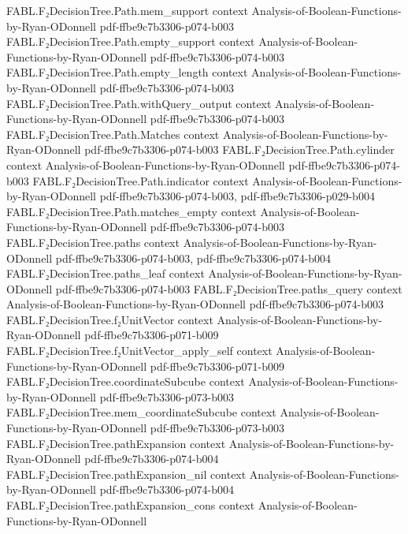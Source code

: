 \begin{theorem}
  {FABL.F₂DecisionTree.Path.mem_support}
  {context}
  {Analysis-of-Boolean-Functions-by-Ryan-ODonnell}
  {pdf-ffbe9c7b3306-p074-b003}
\proofstep
  {FABL.F₂DecisionTree.Path.empty_support}
  {context}
  {Analysis-of-Boolean-Functions-by-Ryan-ODonnell}
  {pdf-ffbe9c7b3306-p074-b003}
\proofstep
  {FABL.F₂DecisionTree.Path.empty_length}
  {context}
  {Analysis-of-Boolean-Functions-by-Ryan-ODonnell}
  {pdf-ffbe9c7b3306-p074-b003}
\proofstep
  {FABL.F₂DecisionTree.Path.withQuery_output}
  {context}
  {Analysis-of-Boolean-Functions-by-Ryan-ODonnell}
  {pdf-ffbe9c7b3306-p074-b003}
\proofstep
  {FABL.F₂DecisionTree.Path.Matches}
  {context}
  {Analysis-of-Boolean-Functions-by-Ryan-ODonnell}
  {pdf-ffbe9c7b3306-p074-b003}
\proofstep
  {FABL.F₂DecisionTree.Path.cylinder}
  {context}
  {Analysis-of-Boolean-Functions-by-Ryan-ODonnell}
  {pdf-ffbe9c7b3306-p074-b003}
\proofstep
  {FABL.F₂DecisionTree.Path.indicator}
  {context}
  {Analysis-of-Boolean-Functions-by-Ryan-ODonnell}
  {pdf-ffbe9c7b3306-p074-b003,
    pdf-ffbe9c7b3306-p029-b004}
\proofstep
  {FABL.F₂DecisionTree.Path.matches_empty}
  {context}
  {Analysis-of-Boolean-Functions-by-Ryan-ODonnell}
  {pdf-ffbe9c7b3306-p074-b003}
\proofstep
  {FABL.F₂DecisionTree.paths}
  {context}
  {Analysis-of-Boolean-Functions-by-Ryan-ODonnell}
  {pdf-ffbe9c7b3306-p074-b003,
    pdf-ffbe9c7b3306-p074-b004}
\proofstep
  {FABL.F₂DecisionTree.paths_leaf}
  {context}
  {Analysis-of-Boolean-Functions-by-Ryan-ODonnell}
  {pdf-ffbe9c7b3306-p074-b003}
\proofstep
  {FABL.F₂DecisionTree.paths_query}
  {context}
  {Analysis-of-Boolean-Functions-by-Ryan-ODonnell}
  {pdf-ffbe9c7b3306-p074-b003}
\proofstep
  {FABL.F₂DecisionTree.f₂UnitVector}
  {context}
  {Analysis-of-Boolean-Functions-by-Ryan-ODonnell}
  {pdf-ffbe9c7b3306-p071-b009}
\proofstep
  {FABL.F₂DecisionTree.f₂UnitVector_apply_self}
  {context}
  {Analysis-of-Boolean-Functions-by-Ryan-ODonnell}
  {pdf-ffbe9c7b3306-p071-b009}
\proofstep
  {FABL.F₂DecisionTree.coordinateSubcube}
  {context}
  {Analysis-of-Boolean-Functions-by-Ryan-ODonnell}
  {pdf-ffbe9c7b3306-p073-b003}
\proofstep
  {FABL.F₂DecisionTree.mem_coordinateSubcube}
  {context}
  {Analysis-of-Boolean-Functions-by-Ryan-ODonnell}
  {pdf-ffbe9c7b3306-p073-b003}
\proofstep
  {FABL.F₂DecisionTree.pathExpansion}
  {context}
  {Analysis-of-Boolean-Functions-by-Ryan-ODonnell}
  {pdf-ffbe9c7b3306-p074-b004}
\proofstep
  {FABL.F₂DecisionTree.pathExpansion_nil}
  {context}
  {Analysis-of-Boolean-Functions-by-Ryan-ODonnell}
  {pdf-ffbe9c7b3306-p074-b004}
\proofstep
  {FABL.F₂DecisionTree.pathExpansion_cons}
  {context}
  {Analysis-of-Boolean-Functions-by-Ryan-ODonnell}

\end{theorem}
